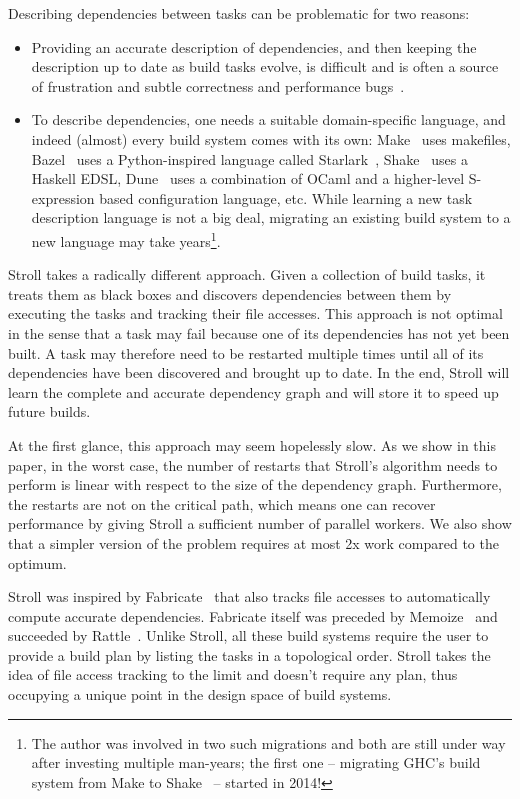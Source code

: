 \documentclass[sigconf]{acmart}
\begin{document}
Describing dependencies between tasks can be problematic for two reasons:

\begin{itemize}
  \item Providing an accurate description of dependencies, and then keeping the
  description up to date as build tasks evolve, is difficult and is often a
  source of frustration and subtle correctness and performance
  bugs~\cite{spall2020build}.

  \item To describe dependencies, one needs a suitable domain-specific language,
  and indeed (almost) every build system comes with its own:
  Make~\cite{feldman1979make} uses makefiles, Bazel~\cite{bazel} uses a
  Python-inspired language called Starlark~\cite{starlark},
  Shake~\cite{mitchell2012shake} uses a Haskell EDSL, Dune~\cite{dune} uses a
  combination of OCaml and a higher-level S-expression based configuration
  language, etc. While learning a new task description language is not a big
  deal, migrating an existing build system to a new language may take
  years\footnote{The author was involved in two such migrations and both are
  still under way after investing multiple man-years; the first one -- migrating
  GHC's build system from Make to Shake~\cite{hadrian} -- started in 2014!}.
\end{itemize}

\noindent
Stroll takes a radically different approach. Given a collection of build tasks,
it treats them as black boxes and discovers dependencies between them by
executing the tasks and tracking their file accesses. This approach is not
optimal in the sense that a task may fail because one of its dependencies has
not yet been built. A task may therefore need to be restarted multiple times
until all of its dependencies have been discovered and brought up to date. In
the end, Stroll will learn the complete and accurate dependency graph and will
store it to speed up future builds.

At the first glance, this approach may seem hopelessly slow. As we show in this
paper, in the worst case, the number of restarts that Stroll's algorithm needs
to perform is linear with respect to the size of the dependency graph.
Furthermore, the restarts are not on the critical path, which means one can
recover performance by giving Stroll a sufficient number of parallel workers. We
also show that a simpler version of the problem requires at most 2x work
compared to the optimum.

Stroll was inspired by Fabricate~\cite{fabricate} that also tracks file accesses
to automatically compute accurate dependencies. Fabricate itself was preceded by
Memoize~\cite{memoize} and succeeded by Rattle~\cite{spall2020build}. Unlike
Stroll, all these build systems require the user to provide a build plan by
listing the tasks in a topological order. Stroll takes the idea of file access
tracking to the limit and doesn't require any plan, thus occupying a unique
point in the design space of build systems.
\end{document}
